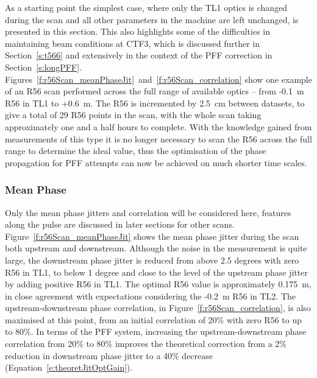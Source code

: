 As a starting point the simplest case, where only the TL1 optics is changed during the scan and all other parameters in the machine are left unchanged, is presented in this section. This also highlights some of the difficulties in maintaining beam conditions at CTF3, which is discussed further in Section~\ref{s:t566} and extensively in the context of the PFF correction in Section~\ref{s:longPFF}. Figures~\ref{f:r56Scan_meanPhaseJit}~and~\ref{f:r56Scan_correlation} show one example of an R56 scan performed across the full range of available optics -- from -0.1~m R56 in TL1 to +0.6~m. The R56 is incremented by 2.5~cm between datasets, to give a total of 29 R56 points in the scan, with the whole scan taking approximately one and a half hours to complete. With the knowledge gained from measurements of this type it is no longer necessary to scan the R56 across the full range to determine the ideal value, thus the optimisation of the phase propagation for PFF attempts can now be achieved on much shorter time scales.

\subsubsection{Mean Phase}

Only the mean phase jitters and correlation will be considered here, features along the pulse are discussed in later sections for other scans. Figure~\ref{f:r56Scan_meanPhaseJit} shows the mean phase jitter during the scan both upstream and downstream. Although the noise in the measurement is quite large, the downstream phase jitter is reduced from above 2.5 degrees with zero R56 in TL1, to below 1 degree and close to the level of the upstream phase jitter by adding positive R56 in TL1. The optimal R56 value is approximately 0.175~m, in close agreement with expectations considering the -0.2~m R56 in TL2. The upstream-downstream phase correlation, in Figure~\ref{f:r56Scan_correlation}, is also maximised at this point, from an initial correlation of 20\% with zero R56 to up to 80\%. In terms of the PFF system, increasing the upstream-downstream phase correlation from 20\% to 80\% improves the theoretical correction from a 2\% reduction in downstream phase jitter to a 40\% decrease (Equation~\ref{e:theoretJitOptGain}).

